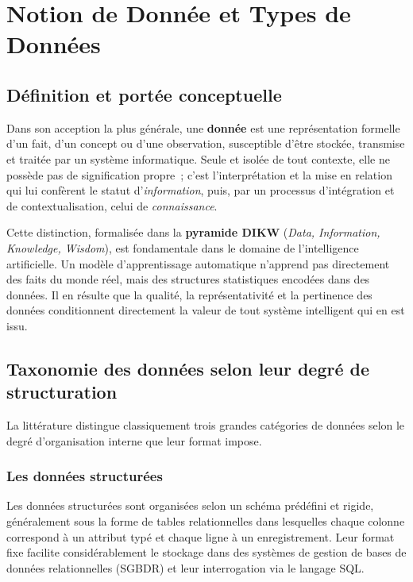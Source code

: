 \section{Notion de Donnée et Types de Données}

\subsection{Définition et portée conceptuelle}

Dans son acception la plus générale, une \textbf{donnée} est une représentation formelle d'un fait, d'un concept ou d'une observation, susceptible d'être stockée, transmise et traitée par un système informatique. Seule et isolée de tout contexte, elle ne possède pas de signification propre~; c'est l'interprétation et la mise en relation qui lui confèrent le statut d'\textit{information}, puis, par un processus d'intégration et de contextualisation, celui de \textit{connaissance}.

Cette distinction, formalisée dans la \textbf{pyramide DIKW} (\textit{Data, Information, Knowledge, Wisdom}), est fondamentale dans le domaine de l'intelligence artificielle. Un modèle d'apprentissage automatique n'apprend pas directement des faits du monde réel, mais des structures statistiques encodées dans des données. Il en résulte que la qualité, la représentativité et la pertinence des données conditionnent directement la valeur de tout système intelligent qui en est issu.

\subsection{Taxonomie des données selon leur degré de structuration}

La littérature distingue classiquement trois grandes catégories de données selon le degré d'organisation interne que leur format impose.

\subsubsection{Les données structurées}

Les données structurées sont organisées selon un schéma prédéfini et rigide, généralement sous la forme de tables relationnelles dans lesquelles chaque colonne correspond à un attribut typé et chaque ligne à un enregistrement. Leur format fixe facilite considérablement le stockage dans des systèmes de gestion de bases de données relationnelles (SGBDR) et leur interrogation via le langage SQL.

